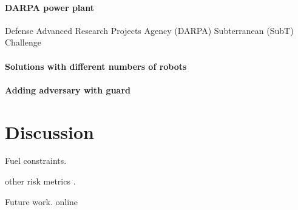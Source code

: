 \documentclass[11pt, oneside]{article}
\begin{document}
\paragraph{DARPA power plant}

Defense Advanced Research Projects Agency (DARPA) Subterranean (SubT) Challenge \cite{chung2023into}

\paragraph{Solutions with different numbers of robots}

\paragraph{Adding adversary with guard}

\section{Discussion}

Fuel constraints.

other risk metrics \cite{majumdar2020should}.

Future work. online




\end{document}
